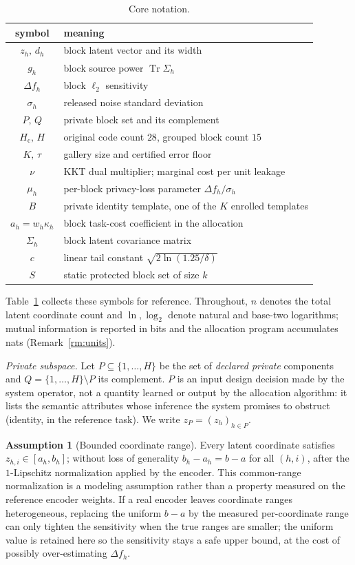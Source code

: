 \documentclass{ieeetj}
\theoremstyle{plain}
\theoremstyle{definition}
\newtheorem{assumption}{Assumption}
\begin{document}
\begin{table}[h]
\centering\footnotesize
\setlength{\tabcolsep}{4pt}
\caption{Core notation.}
\label{tab:notation}
\begin{tabular}{cp{4.4cm}}
\toprule
symbol & meaning \\
\midrule
$z_h,\,d_h$ & block latent vector and its width \\
$g_h$ & block source power $\operatorname{Tr}\Sigma_h$ \\
$\Delta f_h$ & block $\ell_2$ sensitivity \\
$\sigma_h$ & released noise standard deviation \\
$P,\,Q$ & private block set and its complement \\
$H_{\mathrm c},\,H$ & original code count $28$, grouped block count $15$ \\
$K,\,\tau$ & gallery size and certified error floor \\
$\nu$ & KKT dual multiplier; marginal cost per unit leakage \\
$\mu_h$ & per-block privacy-loss parameter $\Delta f_h/\sigma_h$ \\
$B$ & private identity template, one of the $K$ enrolled templates \\
$a_h=w_h\kappa_h$ & block task-cost coefficient in the allocation \\
$\Sigma_h$ & block latent covariance matrix \\
$c$ & linear tail constant $\sqrt{2\ln(1.25/\delta)}$ \\
$S$ & static protected block set of size $k$ \\
\bottomrule
\end{tabular}
\end{table}
Table~\ref{tab:notation} collects these symbols for reference. Throughout,
$n$ denotes the total latent coordinate count and $\ln,\log_2$ denote natural
and base-two logarithms; mutual information is reported in bits and the
allocation program accumulates nats (Remark~\ref{rm:units}).

\emph{Private subspace.} Let $P\subseteq\{1,\dots,H\}$ be the set of
\emph{declared private} components and $Q=\{1,\dots,H\}\setminus P$ its
complement. $P$ is an input design decision made by the system operator, not a
quantity learned or output by the allocation algorithm: it lists the semantic
attributes whose inference the system promises to obstruct (identity, in the
reference task). We write $z_P=(z_h)_{h\in P}$.

\begin{assumption}[Bounded coordinate range]
\label{as:range}
Every latent coordinate satisfies $z_{h,i}\in[a_h,b_h]$; without loss of
generality $b_h-a_h=b-a$ for all $(h,i)$, after the $1$-Lipschitz
normalization applied by the encoder. This common-range normalization is a
modeling assumption rather than a property measured on the reference encoder
weights. If a real encoder leaves coordinate ranges heterogeneous, replacing
the uniform $b-a$ by the measured per-coordinate range can only tighten the
sensitivity when the true ranges are smaller; the uniform value is retained
here so the sensitivity stays a safe upper bound, at the cost of possibly
over-estimating $\Delta f_h$.
\end{assumption}
\end{document}
